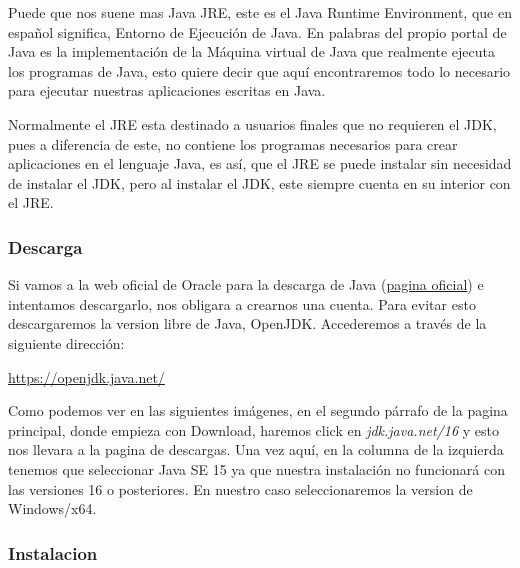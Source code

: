 \documentclass[a4paper,10pt]{article}
\begin{document}
Puede que nos suene mas Java JRE, este es el Java Runtime Environment, que en español significa, Entorno de Ejecución de Java. En palabras del propio portal de Java es la implementación de la Máquina virtual de Java que realmente ejecuta los programas de Java, esto quiere decir que aquí encontraremos todo lo necesario para ejecutar nuestras aplicaciones escritas en Java. 

Normalmente el JRE esta destinado a usuarios finales que no requieren el JDK, pues a diferencia de este, no contiene los programas necesarios para crear aplicaciones en el lenguaje Java, es así, que el JRE se puede instalar sin necesidad de instalar el JDK, pero al instalar el JDK, este siempre cuenta en su interior con el JRE.

\subsubsection{Descarga}

Si vamos a la web oficial de Oracle para la descarga de Java (\href{https://www.oracle.com/es/java/technologies/javase/javase-jdk8-downloads.html}{pagina oficial}) e intentamos descargarlo, nos obligara a crearnos una cuenta. Para evitar esto descargaremos la version libre de Java, OpenJDK. Accederemos a través de la siguiente dirección:

\begin{center}
\href{https://openjdk.java.net/}{https://openjdk.java.net/} 
\end{center}


Como podemos ver en las siguientes imágenes, en el segundo párrafo de la pagina principal, donde empieza con Download, haremos click  en \textit{jdk.java.net/16} y esto nos llevara a la pagina de descargas. Una vez aquí, en la columna de la izquierda tenemos que seleccionar Java SE 15 ya que nuestra instalación no funcionará con las versiones 16 o posteriores. En nuestro caso seleccionaremos la version de Windows/x64.

\begin{figure}[h]
\centering
{}
\end{figure}
 
\clearpage

\subsubsection{Instalacion}
\end{document}
